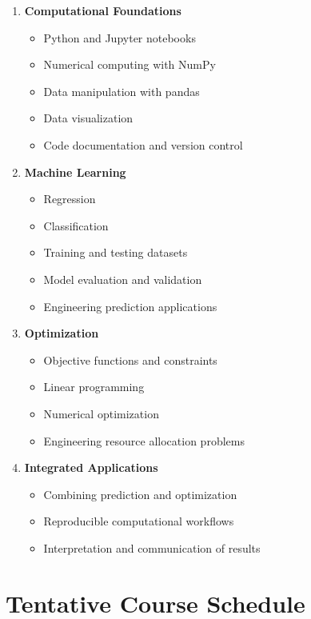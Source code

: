\documentclass[11pt]{article}
\begin{document}
\begin{enumerate}[nosep]
    \item \textbf{Computational Foundations}
    \begin{itemize}[nosep]
        \item Python and Jupyter notebooks
        \item Numerical computing with NumPy
        \item Data manipulation with pandas
        \item Data visualization
        \item Code documentation and version control
    \end{itemize}

    \item \textbf{Machine Learning}
    \begin{itemize}[nosep]
        \item Regression
        \item Classification
        \item Training and testing datasets
        \item Model evaluation and validation
        \item Engineering prediction applications
    \end{itemize}

    \item \textbf{Optimization}
    \begin{itemize}[nosep]
        \item Objective functions and constraints
        \item Linear programming
        \item Numerical optimization
        \item Engineering resource allocation problems
    \end{itemize}

    \item \textbf{Integrated Applications}
    \begin{itemize}[nosep]
        \item Combining prediction and optimization
        \item Reproducible computational workflows
        \item Interpretation and communication of results
    \end{itemize}
\end{enumerate}

\section*{Tentative Course Schedule}
\end{document}
